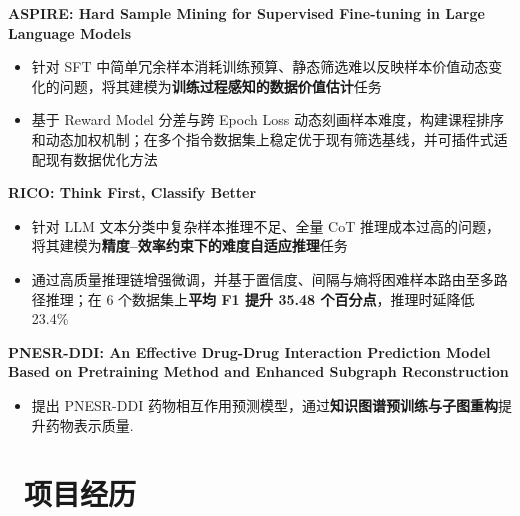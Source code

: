 \documentclass{resume}
\begin{document}
\noindent
\textbf{ASPIRE: Hard Sample Mining for Supervised Fine-tuning in Large Language Models}\par
{}
\begin{itemize}
  \item 针对 SFT 中简单冗余样本消耗训练预算、静态筛选难以反映样本价值动态变化的问题，将其建模为\textbf{训练过程感知的数据价值估计}任务
  \item 基于 Reward Model 分差与跨 Epoch Loss 动态刻画样本难度，构建课程排序和动态加权机制；在多个指令数据集上稳定优于现有筛选基线，并可插件式适配现有数据优化方法
\end{itemize}

\noindent
\textbf{RICO: Think First, Classify Better}\par
{}
\begin{itemize}
  \item 针对 LLM 文本分类中复杂样本推理不足、全量 CoT 推理成本过高的问题，将其建模为\textbf{精度--效率约束下的难度自适应推理}任务
  \item 通过高质量推理链增强微调，并基于置信度、间隔与熵将困难样本路由至多路径推理；在 6 个数据集上\textbf{平均 F1 提升 35.48 个百分点}，推理时延降低 23.4\%
\end{itemize}

\noindent
\textbf{PNESR-DDI: An Effective Drug-Drug Interaction Prediction Model Based on Pretraining Method and Enhanced Subgraph Reconstruction}\par
{}
\begin{itemize}
  \item 提出 PNESR-DDI 药物相互作用预测模型，通过\textbf{知识图谱预训练与子图重构}提升药物表示质量.
\end{itemize}

\section{\ 项目经历}
\noindent
\end{document}
